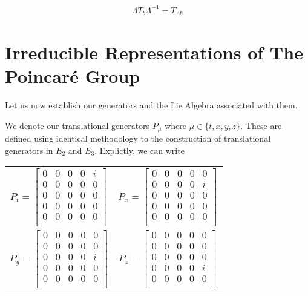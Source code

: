\begin{equation}
\begin{aligned}
	\Lambda T_b \Lambda^{-1} = T_{\Lambda b}
\end{aligned}
\end{equation}

\section{Irreducible Representations of The Poincar\'e Group}

Let us now establish our generators and the Lie Algebra associated with them.

We denote our translational generators $P_\mu$ where $\mu\in\{t,x,y,z\}$. These are defined using identical methodology to the construction of translational generators in $E_2$ and $E_3$. Explictly, we can write 

\begin{center}
\begin{tabular}{cc}
	$P_t = \begin{bmatrix}
				0 & 0 & 0 & 0 & i \\
				0 & 0 & 0 & 0 & 0\\
				0 & 0 & 0 & 0 & 0\\
				0 & 0 & 0 & 0 & 0\\
				0 & 0 & 0 & 0 & 0\\
			\end{bmatrix}$ &
	$P_x = \begin{bmatrix}
				0 & 0 & 0 & 0 & 0 \\
				0 & 0 & 0 & 0 & i\\
				0 & 0 & 0 & 0 & 0\\
				0 & 0 & 0 & 0 & 0\\
				0 & 0 & 0 & 0 & 0\\
			\end{bmatrix}$ \\
	$P_y = \begin{bmatrix}
				0 & 0 & 0 & 0 & 0 \\
				0 & 0 & 0 & 0 & 0\\
				0 & 0 & 0 & 0 & i\\
				0 & 0 & 0 & 0 & 0\\
				0 & 0 & 0 & 0 & 0\\
			\end{bmatrix}$ &
	$P_z = \begin{bmatrix}
				0 & 0 & 0 & 0 & 0 \\
				0 & 0 & 0 & 0 & 0\\
				0 & 0 & 0 & 0 & 0\\
				0 & 0 & 0 & 0 & i\\
				0 & 0 & 0 & 0 & 0\\
			\end{bmatrix}$
\end{tabular}
\end{center}

